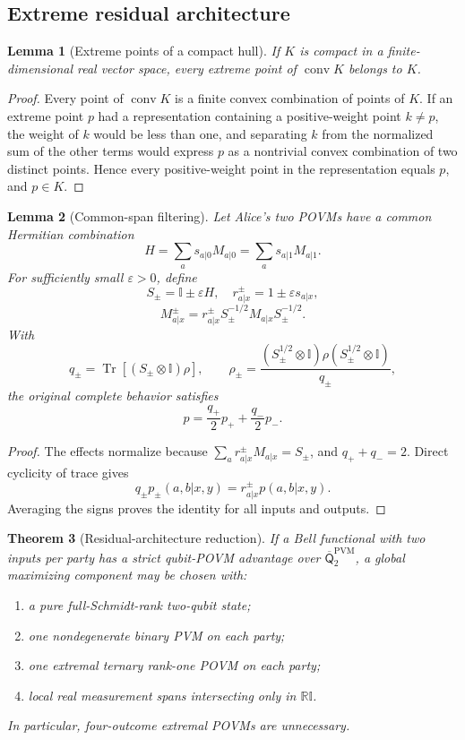 \documentclass[11pt]{article}
\newtheorem{theorem}{Theorem}[section]
\newtheorem{lemma}[theorem]{Lemma}
\theoremstyle{definition}
\newcommand{\Tr}{\operatorname{Tr}}
\newcommand{\conv}{\operatorname{conv}}
\newcommand{\id}{\mathbb I}
\newcommand{\R}{\mathbb R}
\newcommand{\Qbar}{\overline{\mathsf Q}}
\newcommand{\PVM}{\mathrm{PVM}}
\newcommand{\eps}{\varepsilon}
\begin{document}
\subsection{Extreme residual architecture}

\begin{lemma}[Extreme points of a compact hull]
\label{lem:extreme-hull}
If \(K\) is compact in a finite-dimensional real vector space, every extreme
point of \(\conv K\) belongs to \(K\).
\end{lemma}

\begin{proof}
Every point of \(\conv K\) is a finite convex combination of points of \(K\).
If an extreme point \(p\) had a representation containing a
positive-weight point \(k\ne p\), the weight of \(k\) would be less than
one, and separating \(k\) from the normalized sum of the other terms would
express \(p\) as a nontrivial convex combination of two distinct points.
Hence every positive-weight point in the representation equals \(p\), and
\(p\in K\).
\end{proof}

\begin{lemma}[Common-span filtering]
\label{lem:common-span}
Let Alice's two POVMs have a common Hermitian combination
\[
H=\sum_a s_{a|0}M_{a|0}=\sum_a s_{a|1}M_{a|1}.
\]
For sufficiently small \(\eps>0\), define
\[
S_\pm=\id\pm\eps H,\quad
r^\pm_{a|x}=1\pm\eps s_{a|x},
\]
\[
M^\pm_{a|x}
=r^\pm_{a|x}S_\pm^{-1/2}M_{a|x}S_\pm^{-1/2}.
\]
With
\[
q_\pm=\Tr[(S_\pm\otimes\id)\rho],\qquad
\rho_\pm=
\frac{(S_\pm^{1/2}\otimes\id)\rho(S_\pm^{1/2}\otimes\id)}
{q_\pm},
\]
the original complete behavior satisfies
\[
p=\frac{q_+}{2}p_++\frac{q_-}{2}p_-.
\]
\end{lemma}

\begin{proof}
The effects normalize because
\(\sum_a r^\pm_{a|x}M_{a|x}=S_\pm\), and \(q_++q_-=2\).
Direct cyclicity of trace gives
\[
q_\pm p_\pm(a,b|x,y)=r^\pm_{a|x}p(a,b|x,y).
\]
Averaging the signs proves the identity for all inputs and outputs.
\end{proof}

\begin{theorem}[Residual-architecture reduction]
\label{thm:residual-reduction}
If a Bell functional with two inputs per party has a strict qubit-POVM advantage over
\(\Qbar^{\PVM}_2\), a global maximizing component may be chosen with:
\begin{enumerate}[label=(\roman*),itemsep=2pt]
\item a pure full-Schmidt-rank two-qubit state;
\item one nondegenerate binary PVM on each party;
\item one extremal ternary rank-one POVM on each party;
\item local real measurement spans intersecting only in \(\R\id\).
\end{enumerate}
In particular, four-outcome extremal POVMs are unnecessary.
\end{theorem}
\end{document}
